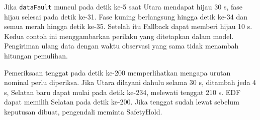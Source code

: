 Jika \texttt{dataFault} muncul pada detik ke-5 saat Utara mendapat hijau 30 s, fase hijau selesai pada detik ke-31. Fase kuning berlangsung hingga detik ke-34 dan semua merah hingga detik ke-35. Setelah itu Fallback dapat memberi hijau 10 s. Kedua contoh ini menggambarkan perilaku yang ditetapkan dalam model. Pengiriman ulang data dengan waktu observasi yang sama tidak menambah hitungan pemulihan.

Pemeriksaan tenggat pada detik ke-200 memperlihatkan mengapa urutan nominal perlu diperiksa. Jika Utara dilayani dahulu selama 30 s, ditambah jeda 4 s, Selatan baru dapat mulai pada detik ke-234, melewati tenggat 210 s. EDF dapat memilih Selatan pada detik ke-200. Jika tenggat sudah lewat sebelum keputusan dibuat, pengendali meminta SafetyHold.
